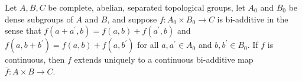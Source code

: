 Let $A, B, C$ be complete, abelian, separated topological groups, let $A_0$ and $B_0$ be dense subgroups of $A$ and $B$, and suppose $f: A_0 \times B_0 \rightarrow C$ is bi-additive in the sense that $f(a + a^\prime, b) = f(a, b) + f(a^\prime, b)$ and $f(a, b + b^\prime) = f(a, b) + f(a, b^\prime)$ for all $a, a^\prime \in A_0$ and $b, b^\prime \in B_0$. If $f$ is continuous, then $f$ extends uniquely to a continuous bi-additive map $\bar{f}: A \times B \rightarrow C$.